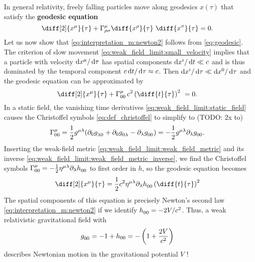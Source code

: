 In general relativity, freely falling particles move along geodesics $x(\tau)$ that satisfy the \textbf{geodesic equation}
\begin{equation}
	\diff[2]{x^\mu}{\tau} + \Gamma^\mu_{\rho \sigma} \diff{x^\rho}{\tau} \diff{x^\sigma}{\tau} = 0 .
	\label{eq:geodesic}
\end{equation}
Let us now show that \cref{eq:interpretation_m:newton2} follows from \cref{eq:geodesic}.
The criterion of slow movement \cref{eq:weak_field_limit:small_velocity} implies that a particle with velocity $\mathop{}\!\mathrm{d} x^\mu / \mathop{}\!\mathrm{d} \tau$ has spatial components $\mathop{}\!\mathrm{d} x^i / \mathop{}\!\mathrm{d} t \ll c$ and is thus dominated by the temporal component $c \mathop{}\!\mathrm{d} t / \mathop{}\!\mathrm{d} \tau \approx c$.
Then $\mathop{}\!\mathrm{d} x^i / \mathop{}\!\mathrm{d} \tau \ll \mathop{}\!\mathrm{d} x^0 / \mathop{}\!\mathrm{d} \tau$ and the geodesic equation can be approximated by
\begin{equation*}
	\diff[2]{x^\mu}{\tau} + \Gamma^\mu_{00} \, c^2 \left( \diff{t}{\tau} \right)^2 = 0 .
\end{equation*}
In a static field, the vanishing time derivatives \eqref{eq:weak_field_limit:static_field} causes the Christoffel symbols \eqref{eq:def_christoffel} to simplify to (TODO: 2x to)
\begin{equation}
	\Gamma^\mu_{00} = \frac{1}{2} g\indices{^\mu^\lambda} (\partial_0 g\indices{_\lambda_0} + \partial_0 g\indices{_0_\lambda} - \partial_\lambda g\indices{_0_0}) = -\frac{1}{2} g\indices{^\mu^\lambda} \partial_\lambda g\indices{_0_0} .
	\label{eq:weak_field_limit:simplified_christoffel_symbols}
\end{equation}
Inserting the weak-field metric \eqref{eq:weak_field_limit:weak_field_metric} and its inverse \eqref{eq:weak_field_limit:weak_field_metric_inverse}, we find the Christoffel symbols $\Gamma^\mu_{00} = -\frac{1}{2} \eta\indices{^\mu^\lambda} \partial_\lambda h\indices{_0_0}$ to first order in $h$, so the geodesic equation becomes
\begin{equation*}
	\diff[2]{x^\mu}{\tau} = \frac{1}{2} c^2 \eta\indices{^\mu^\lambda} \partial_\lambda h\indices{_0_0} \left( \diff{t}{\tau} \right)^2
\end{equation*}
The spatial components of this equation is precisely Newton's second law \cref{eq:interpretation_m:newton2} if we identify $h\indices{_0_0} = -2V/c^2$.
Thus, a weak relativistic gravitational field with
\begin{equation}
	g\indices{_0_0} = -1 + h_{00} = - \left( 1 + \frac{2V}{c^2} \right)
\end{equation}
describes Newtonian motion in the gravitational potential $V$ !

